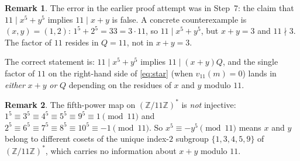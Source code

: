 \documentclass[12pt]{article}
\theoremstyle{definition}
\newtheorem{remark}{Remark}
\begin{document}
\begin{remark}
The error in the earlier proof attempt was in Step~7: the claim that
$11 \mid x^5 + y^5$ implies $11 \mid x + y$ is false. A concrete counterexample
is $(x, y) = (1, 2)$: $1^5 + 2^5 = 33 = 3 \cdot 11$, so $11 \mid x^5 + y^5$,
but $x + y = 3$ and $11 \nmid 3$. The factor of $11$ resides in $Q = 11$, not in
$x + y = 3$.

The correct statement is: $11 \mid x^5 + y^5$ implies $11 \mid (x+y)Q$, and
the single factor of $11$ on the right-hand side of \eqref{eq:star} (when
$v_{11}(m)=0$) lands in \emph{either} $x+y$ \emph{or} $Q$ depending on the
residues of $x$ and $y$ modulo $11$.
\end{remark}

\begin{remark}
The fifth-power map on $(\mathbb{Z}/11\mathbb{Z})^*$ is \emph{not} injective:
$1^5 \equiv 3^5 \equiv 4^5 \equiv 5^5 \equiv 9^5 \equiv 1 \pmod{11}$ and
$2^5 \equiv 6^5 \equiv 7^5 \equiv 8^5 \equiv 10^5 \equiv -1 \pmod{11}$.
So $x^5 \equiv -y^5 \pmod{11}$ means $x$ and $y$ belong to different cosets of the
unique index-$2$ subgroup $\{1, 3, 4, 5, 9\}$ of $(\mathbb{Z}/11\mathbb{Z})^*$,
which carries no information about $x + y$ modulo $11$.
\end{remark}
\end{document}

